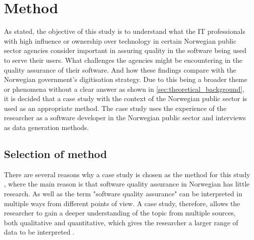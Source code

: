 \chapter{Method} \label{sec:method}


As stated, the objective of this study is to understand what the IT professionals with high influence or ownership over technology in certain Norwegian public sector agencies consider important in assuring quality in the software being used to serve their users. What challenges the agencies might be encountering in the quality assurance of their software. And how these findings compare with the Norwegian government's digitisation strategy. Due to this being a broader theme or phenomena \cite{bjo_2022} without a clear answer as shown in \autoref{sec:theoretical_background}, it is decided that a case study with the context of the Norwegian public sector is used as an appropriate method. The case study uses the experience of the researcher as a software developer in the Norwegian public sector and interviews as data generation methods.

\section{Selection of method}
There are several reasons why a case study is chosen as the method for this study \cite{bjo_2022}, where the main reason is that software quality assurance in Norwegian has little research. As well as the term "software quality assurance" can be interpreted in multiple ways from different points of view. A case study, therefore, allows the researcher to gain a deeper understanding of the topic from multiple sources, both qualitative and quantitative, which gives the researcher a larger range of data to be interpreted \cite{bjo_2022}.

